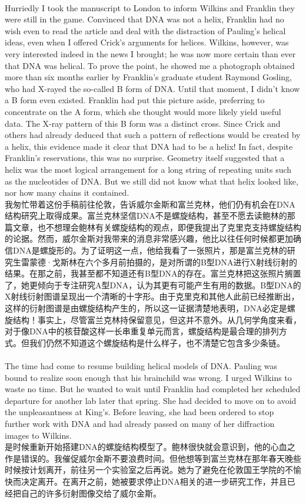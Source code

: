 \documentclass{article}
\begin{document}
\\
Hurriedly I took the manuscript to London to inform Wilkins and Franklin they were still in the game. Convinced that DNA was not a helix, Franklin had no wish even to read the article and deal with the distraction of Pauling’s helical ideas, even when I offered Crick’s arguments for helices. Wilkins, however, was very interested indeed in the news I brought; he was now more certain than ever that DNA was helical. To prove the point, he showed me a photograph obtained more than six months earlier by Franklin’s graduate student Raymond Gosling, who had X-rayed the so-called B form of DNA. Until that moment, I didn’t know a B form even existed. Franklin had put this picture aside, preferring to concentrate on the A form, which she thought would more likely yield useful data. The X-ray pattern of this B form was a distinct cross. Since Crick and others had already deduced that such a pattern of reflections would be created by a helix, this evidence made it clear that DNA had to be a helix! In fact, despite Franklin’s reservations, this was no surprise. Geometry itself suggested that a helix was the most logical arrangement for a long string of repeating units such as the nucleotides of DNA. But we still did not know what that helix looked like, nor how many chains it contained.\\
我匆忙带着这份手稿前往伦敦，告诉威尔金斯和富兰克林，他们仍有机会在DNA结构研究上取得成果。富兰克林坚信DNA不是螺旋结构，甚至不愿去读鲍林的那篇文章，也不想理会鲍林有关螺旋结构的观点，即便我提出了克里克支持螺旋结构的论据。然而，威尔金斯对我带来的消息非常感兴趣，他比以往任何时候都更加确信DNA是螺旋形的。为了证明这一点，他给我看了一张照片，那是富兰克林的研究生雷蒙德·戈斯林在六个多月前拍摄的，是对所谓的B型DNA进行X射线衍射的结果。在那之前，我甚至都不知道还有B型DNA的存在。富兰克林把这张照片搁置了，她更倾向于专注研究A型DNA，认为其更有可能产生有用的数据。B型DNA的X射线衍射图谱呈现出一个清晰的十字形。由于克里克和其他人此前已经推断出，这样的衍射图谱是由螺旋结构产生的，所以这一证据清楚地表明，DNA必定是螺旋结构！事实上，尽管富兰克林持保留意见，但这并不意外。从几何学角度来看，对于像DNA中的核苷酸这样一长串重复单元而言，螺旋结构是最合理的排列方式。但我们仍然不知道这个螺旋结构是什么样子，也不清楚它包含多少条链。\\ 

\\
The time had come to resume building helical models of DNA. Pauling was bound to realize soon enough that his brainchild was wrong. I urged Wilkins to waste no time. But he wanted to wait until Franklin had completed her scheduled departure for another lab later that spring. She had decided to move on to avoid the unpleasantness at King’s. Before leaving, she had been ordered to stop further work with DNA and had already passed on many of her diffraction images to Wilkins.\\
是时候重新开始搭建DNA的螺旋结构模型了。鲍林很快就会意识到，他的心血之作是错误的。我催促威尔金斯不要浪费时间。但他想等到富兰克林在那年春天晚些时候按计划离开，前往另一个实验室之后再说。她为了避免在伦敦国王学院的不愉快而决定离开。在离开之前，她被要求停止DNA相关的进一步研究工作，并且已经把自己的许多衍射图像交给了威尔金斯。\\
\end{document}
